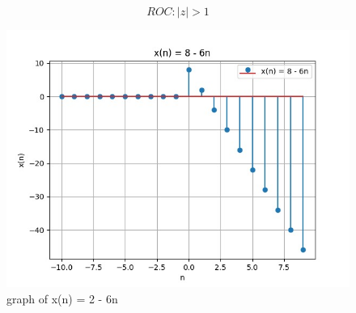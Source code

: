 \documentclass[journal,12pt,twocolumn]{IEEEtran}
\theoremstyle{remark}
\begin{document}
\[ ROC : |z| > 1\]

    \begin{figure}[h]
        \centering
        \includegraphics[width=1\linewidth]{figs/Figure_1}
        \caption{graph of x(n) = 2 - 6n}
    \end{figure}

    
\end{document}
